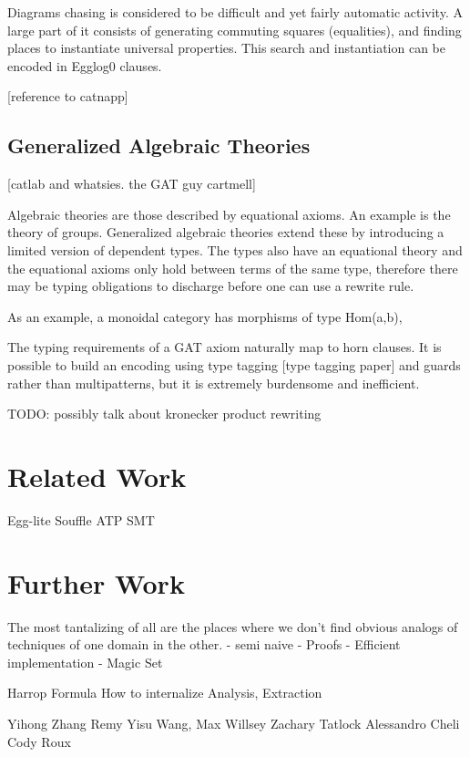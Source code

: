 \documentclass[sigplan,10pt,review,anonymous]{acmart}
\begin{document}
Diagrams chasing is considered to be difficult and yet fairly automatic activity. A large part of it consists of generating commuting squares (equalities), and finding places to instantiate universal properties. This search and instantiation can be encoded in Egglog0 clauses.  

[reference to catnapp]

\subsection{Generalized Algebraic Theories}
[catlab and whatsies. the GAT guy cartmell]

Algebraic theories are those described by equational axioms. An example is the theory of groups. Generalized algebraic theories extend these by introducing a limited version of dependent types. The types also have an equational theory and the equational axioms only hold between terms of the same type, therefore there may be typing obligations to discharge before one can use a rewrite rule.

As an example, a monoidal category has morphisms of type Hom(a,b),

The typing requirements of a GAT axiom naturally map to horn clauses. It is possible to build an encoding using type tagging [type tagging paper] and guards rather than multipatterns, but it is extremely burdensome and inefficient.

TODO: possibly talk about kronecker product rewriting

\section{Related Work}
Egg-lite
Souffle
ATP
SMT


\section{Further Work}
The most tantalizing of all are the places where we don't find obvious analogs of techniques of one domain in the other.
- semi naive
- Proofs
- Efficient implementation
- Magic Set

Harrop Formula
How to internalize Analysis, Extraction

\begin{acks}                            %
  Yihong Zhang
Remy Yisu Wang,
Max Willsey
Zachary Tatlock
Alessandro Cheli
Cody Roux
\end{acks}
\end{document}

